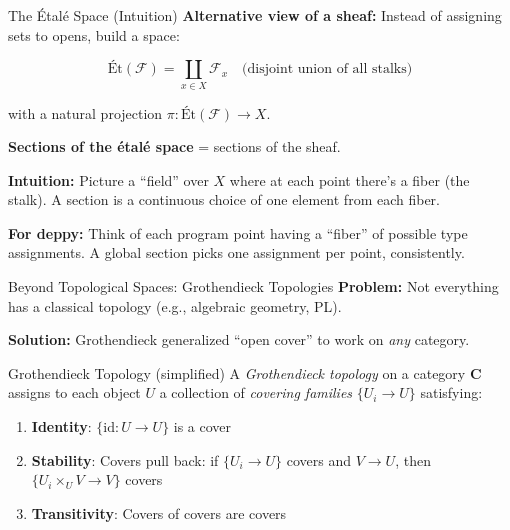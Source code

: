 \documentclass[aspectratio=169,10pt]{beamer}
\newcommand{\Fscr}{\mathcal{F}}
\newcommand{\id}{\mathrm{id}}
\begin{document}
\begin{frame}{The \'Etal\'e Space (Intuition)}
\textbf{Alternative view of a sheaf:} Instead of assigning sets to opens, build a space:

\[
\text{\'Et}(\Fscr) = \coprod_{x \in X} \Fscr_x \quad\text{(disjoint union of all stalks)}
\]

with a natural projection $\pi : \text{\'Et}(\Fscr) \to X$.

\textbf{Sections of the \'etal\'e space} = sections of the sheaf.

\vspace{0.5em}
\textbf{Intuition:} Picture a ``field'' over $X$ where at each point there's a fiber (the stalk). A section is a continuous choice of one element from each fiber.

\textbf{For deppy:} Think of each program point having a ``fiber'' of possible type assignments. A global section picks one assignment per point, consistently.
\end{frame}

\begin{frame}{Beyond Topological Spaces: Grothendieck Topologies}
\textbf{Problem:} Not everything has a classical topology (e.g., algebraic geometry, PL).

\textbf{Solution:} Grothendieck generalized ``open cover'' to work on \emph{any} category.

\begin{block}{Grothendieck Topology (simplified)}
A \emph{Grothendieck topology} on a category $\mathbf{C}$ assigns to each object $U$ a collection of \emph{covering families} $\{U_i \to U\}$ satisfying:
\begin{enumerate}
  \item \textbf{Identity}: $\{\id : U \to U\}$ is a cover
  \item \textbf{Stability}: Covers pull back: if $\{U_i \to U\}$ covers and $V \to U$, then $\{U_i \times_U V \to V\}$ covers
  \item \textbf{Transitivity}: Covers of covers are covers
\end{enumerate}
\end{block}
\end{frame}
\end{document}
